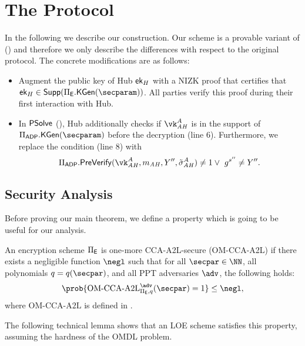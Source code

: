 \section{The \aalplus Protocol}\label{sec:modified-a2l}

In the following we describe our \aalplus construction. Our scheme is a provable variant of \aal () and therefore we only describe the differences with respect to the original protocol. The concrete modifications are as follows:
\begin{itemize}
    \item Augment the public key of Hub $\mathsf{ek}_H$ with a NIZK proof that certifies that $\ek_H \in \mathsf{Supp}(\Pi_\ENC.\kgen(\secparam))$. All parties verify this proof during their first interaction with Hub.
    \item In $\mathsf{PSolve}$ (), 
    Hub additionally checks if $\vk_\ah^A$ is in the support of $\Pi_\ADP.\kgen(\secparam)$ before the decryption  (line 6). Furthermore, we replace the condition (line 8) with
    $$\Pi_\ADP.\prevrfy(\vk_\ah^A, m_\ah, Y'', \presig_\ah^A) \neq 1 \lor \ g^{s''} \neq Y''.$$
\end{itemize}

\subsection{Security Analysis}\label{sec:a2l-analysis}

Before proving our main theorem, we define a property which is going to be useful for our analysis.

\begin{definition}[OM-CCA-A2L]
    An encryption scheme $\Pi_{\mathsf{E}}$ is one-more CCA-A2L-secure (OM-CCA-A2L) if there exists a negligible function $\negl$ such that for all $\secpar \in \NN$, all polynomials $q = q(\secpar)$, and all PPT adversaries $\adv$, the following holds:
    \[ 
        \prob{\textrm{OM-CCA-A2L}_{\Pi_\ENC,q}^\adv(\secpar) = 1} \le \negl,
    \]
    where $\textrm{OM-CCA-A2L}$ is defined in . 
\end{definition}



The following technical lemma shows that an LOE scheme satisfies this property, assuming the hardness of the OMDL problem.

